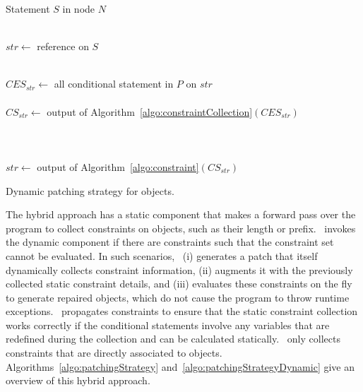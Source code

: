 \begin{algorithm}[t]
\scriptsize
\DontPrintSemicolon
{}
\Begin
{
  {
  Statement $S$ in node $N$\\
   {\\
  	\mytab $str \longleftarrow$  reference on $S$
  	
  	 {\\
          \mytab $CES_{str} \longleftarrow$ all conditional statement in $P$ on
$str$\\
 
 \mytab  {}\\
  	  \mytab $CS_{str} \longleftarrow$ output of
Algorithm~\ref{algo:constraintCollection}$(CES_{str})$\\

  		\mytab {} {\\
  		
  		\mytab \mytab {} {\\

\mytab\mytab {}\\
                        \mytab \mytab \mytab $str \longleftarrow$ output of
Algorithm~\ref{algo:constraint}$(CS_{str})$
  		} \mytab \mytab {}
  		}
		\vspace{-4em} 
    }
  }
 }
}

\caption{Dynamic patching strategy for  objects.}
\label{algo:patchingStrategyDynamic}
\end{algorithm}

The hybrid approach has a static component that makes a forward pass over the
program to collect constraints on  objects, such as their length or
prefix. \tool\ invokes the dynamic component if there are constraints such that
the constraint set cannot be evaluated. In such scenarios, \tool\ (i) generates
a patch that itself dynamically collects constraint information, (ii) augments
it with the previously collected static constraint details, and (iii) evaluates
these constraints on the fly to generate repaired  objects, which
do not cause the program to throw runtime exceptions. \tool\ propagates
constraints to ensure that the static constraint collection works correctly if
the conditional statements involve any variables that are redefined during the
collection and can be calculated statically. \tool\ only collects constraints
that are directly associated to  objects.
Algorithms~\ref{algo:patchingStrategy} and~\ref{algo:patchingStrategyDynamic}
give an overview of this hybrid approach.

